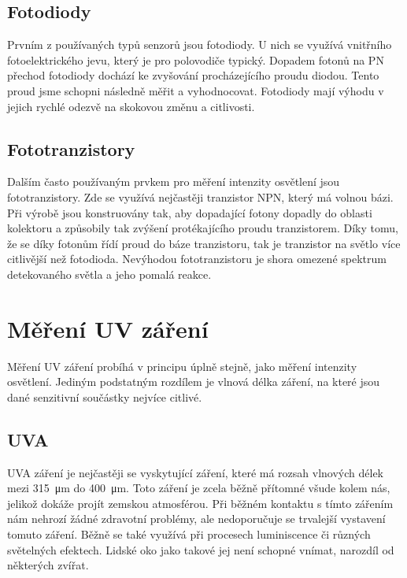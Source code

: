 \subsection{Fotodiody}

Prvním z používaných typů senzorů jsou fotodiody. U nich se využívá vnitřního fotoelektrického jevu, který je pro polovodiče typický. Dopadem fotonů na PN přechod fotodiody dochází ke zvyšování procházejícího proudu diodou. Tento proud jsme schopni následně měřit a vyhodnocovat. Fotodiody mají výhodu v jejich rychlé odezvě na skokovou změnu a citlivosti.

\subsection{Fototranzistory}

Dalším často používaným prvkem pro měření intenzity osvětlení jsou fototranzistory. Zde se využívá nejčastěji tranzistor NPN, který má volnou bázi. Při výrobě jsou konstruovány tak, aby dopadající fotony dopadly do oblasti kolektoru a způsobily tak zvýšení protékajícího proudu tranzistorem. Díky tomu, že se díky fotonům řídí proud do báze tranzistoru, tak je tranzistor na světlo více citlivější než fotodioda. Nevýhodou fototranzistoru je shora omezené spektrum detekovaného světla a jeho pomalá reakce.

\section{Měření UV záření}

Měření UV záření probíhá v principu úplně stejně, jako měření intenzity osvětlení. Jediným podstatným rozdílem je vlnová délka záření, na které jsou dané senzitivní součástky nejvíce citlivé. 

\subsection{UVA}

UVA záření je nejčastěji se vyskytující záření, které má rozsah vlnových délek mezi \SI{315}{\micro\metre} do \SI{400}{\micro\metre}. Toto záření je zcela běžně přítomné všude kolem nás, jelikož dokáže projít zemskou atmosférou. Při běžném kontaktu s tímto zářením nám nehrozí žádné zdravotní problémy, ale nedoporučuje se trvalejší vystavení tomuto záření. Běžně se také využívá při procesech luminiscence či různých světelných efektech. Lidské oko jako takové jej není schopné vnímat, narozdíl od některých zvířat.

